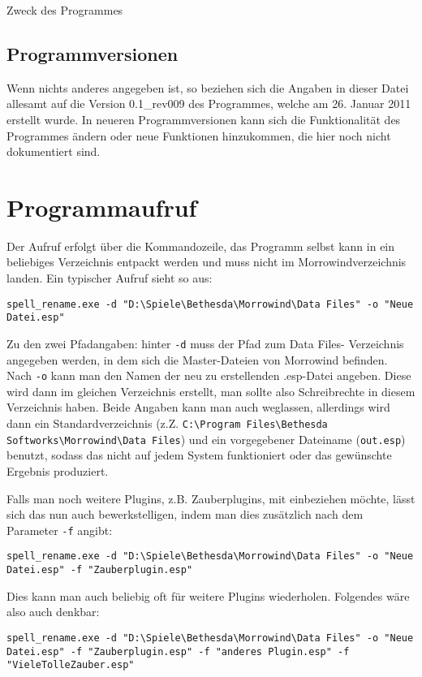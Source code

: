 \documentclass[12pt,twoside,a4paper]{article}
\begin{document}
\begin{section}{Zweck des Programmes}
\subsection{Programmversionen}
Wenn nichts anderes angegeben ist, so beziehen sich die Angaben in dieser Datei
allesamt auf die Version 0.1\_rev009 des Programmes, welche am 26. Januar 2011
erstellt wurde. In neueren Programmversionen kann sich die Funktionalit\"{a}t des
Programmes \"{a}ndern oder neue Funktionen hinzukommen, die hier noch nicht
dokumentiert sind.
\end{section}

\section{Programmaufruf}
Der Aufruf erfolgt \"{u}ber die Kommandozeile, das Programm selbst kann in ein
beliebiges Verzeichnis entpackt werden und muss nicht im Morrowindverzeichnis
landen. Ein typischer Aufruf sieht so aus:

\texttt{spell\_rename.exe -d "D:\textbackslash{}Spiele\textbackslash{}Bethesda\textbackslash{}Morrowind\textbackslash{}Data Files" -o "Neue Datei.esp"}

Zu den zwei Pfadangaben: hinter \texttt{-d} muss der Pfad zum Data Files-
Verzeichnis angegeben werden, in dem sich die Master-Dateien von Morrowind befinden.
Nach \texttt{-o} kann man den Namen der neu zu erstellenden .esp-Datei angeben.
Diese wird dann im gleichen Verzeichnis erstellt, man sollte also Schreibrechte
in diesem Verzeichnis haben. Beide Angaben kann man auch weglassen, allerdings
wird dann ein Standardverzeichnis (z.Z. \texttt{C:\textbackslash{}Program Files\textbackslash{}Bethesda Softworks\textbackslash{}Morrowind\textbackslash{}Data Files})
und ein vorgegebener Dateiname (\texttt{out.esp}) benutzt, sodass das nicht auf
jedem System funktioniert oder das gew\"{u}nschte Ergebnis produziert.

Falls man noch weitere Plugins, z.B. Zauberplugins, mit einbeziehen m\"{o}chte,
l\"{a}sst sich das nun auch bewerkstelligen, indem man dies zus\"{a}tzlich nach
dem Parameter \texttt{-f} angibt:

\texttt{spell\_rename.exe -d "D:\textbackslash{}Spiele\textbackslash{}Bethesda\textbackslash{}Morrowind\textbackslash{}Data Files" -o "Neue Datei.esp" -f "Zauberplugin.esp"}

Dies kann man auch beliebig oft f\"{u}r weitere Plugins wiederholen.
Folgendes w\"{a}re also auch denkbar:

\texttt{spell\_rename.exe -d "D:\textbackslash{}Spiele\textbackslash{}Bethesda\textbackslash{}Morrowind\textbackslash{}Data Files" -o "Neue Datei.esp" -f "Zauberplugin.esp" -f "anderes Plugin.esp" -f "VieleTolleZauber.esp"}
\end{document}
